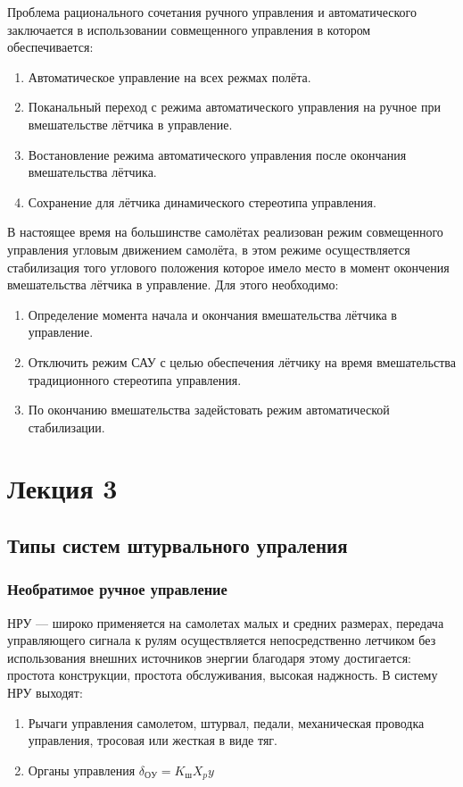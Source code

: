 \documentclass{article}
\begin{document}
Проблема рационального сочетания ручного управления и автоматического заключается в использовании совмещенного управления в котором обеспечивается: 
\begin{enumerate}
\item Автоматическое управление на всех режмах полёта.
\item Поканальный переход с режима автоматического управления на ручное при вмешательстве лётчика в управление.
\item Востановление режима автоматического управления после окончания вмешательства лётчика.
\item Сохранение для лётчика динамического стереотипа управления.
\end{enumerate}
В настоящее время на большинстве самолётах реализован режим совмещенного управления угловым движением самолёта, в этом режиме осуществляется стабилизация того углового положения которое имело место в момент окончения вмешательства лётчика в управление. 
Для этого необходимо:
\begin{enumerate}
\item Определение момента начала и окончания вмешательства лётчика в управление.
\item Отключить режим САУ с целью обеспечения лётчику на время вмешательства традиционного стереотипа управления.
\item По окончанию вмешательства задейстовать режим автоматической стабилизации.  
\end{enumerate}
\newpage

\section{Лекция 3} 
\subsection{Типы систем штурвального упраления}
\subsubsection{Необратимое ручное управление}
НРУ --- широко применяется на самолетах малых и средних размерах, передача управляющего сигнала к рулям осуществляется непосредственно летчиком без использования внешних источников энергии благодаря этому достигается: простота конструкции, простота обслуживания, высокая наджность. 
В систему НРУ выходят:
\begin{enumerate}
\item Рычаги управления самолетом, штурвал, педали, механическая проводка управления, тросовая или жесткая в виде тяг.
\item Органы управления $\delta_{ОУ} = K_ш X_py$
\end{enumerate}
\end{document}
